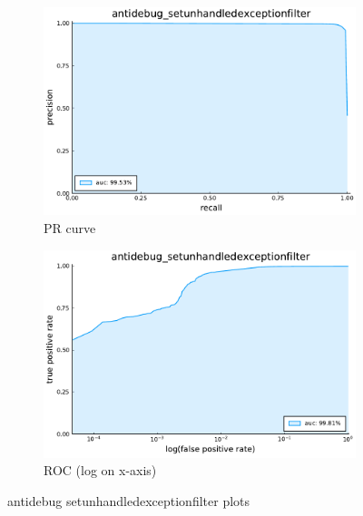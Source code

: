 \begin{figure}
    \centering
    \begin{subfigure}{.49\textwidth}
      \centering
      \includegraphics[width=1\linewidth]{pdfs/modperf/antidebug_setunhandledexceptionfilter.bson-pr.pdf}
      \caption{PR curve}
    \end{subfigure}
    \begin{subfigure}{.49\textwidth}
        \centering
        \includegraphics[width=1\linewidth]{pdfs/modperf/antidebug_setunhandledexceptionfilter.bson-roclog.pdf}
        \caption{ROC (log on x-axis)}
    \end{subfigure}
    \caption{antidebug setunhandledexceptionfilter plots}
    \label{fig:fig}
\end{figure}

